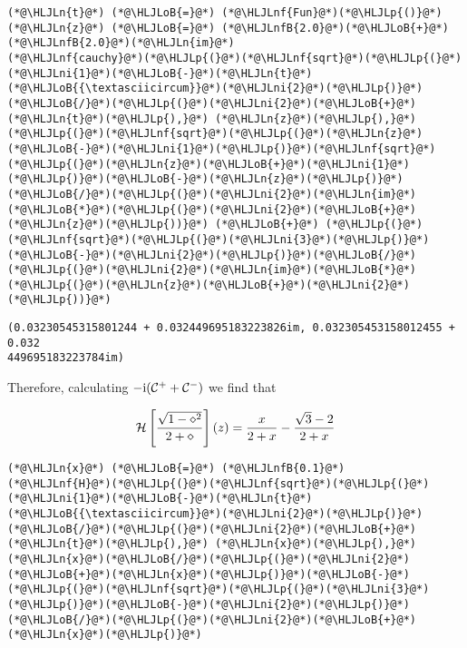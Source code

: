 \documentclass[12pt,landscape]{article}
\newcommand{\HLJLn}[1]{#1}
\newcommand{\HLJLnf}[1]{\textcolor[RGB]{66,102,213}{#1}}
\newcommand{\HLJLnfB}[1]{\textcolor[RGB]{59,151,46}{#1}}
\newcommand{\HLJLni}[1]{\textcolor[RGB]{59,151,46}{#1}}
\newcommand{\HLJLoB}[1]{\textcolor[RGB]{102,102,102}{\textbf{#1}}}
\newcommand{\HLJLp}[1]{#1}
\def\I{ {\rm i} }
\def\CC{ {\cal C} }
\def\HH{ {\cal H} }
\begin{document}
{\begin{lstlisting}
(*@\HLJLn{t}@*) (*@\HLJLoB{=}@*) (*@\HLJLnf{Fun}@*)(*@\HLJLp{()}@*)
(*@\HLJLn{z}@*) (*@\HLJLoB{=}@*) (*@\HLJLnfB{2.0}@*)(*@\HLJLoB{+}@*)(*@\HLJLnfB{2.0}@*)(*@\HLJLn{im}@*)
(*@\HLJLnf{cauchy}@*)(*@\HLJLp{(}@*)(*@\HLJLnf{sqrt}@*)(*@\HLJLp{(}@*)(*@\HLJLni{1}@*)(*@\HLJLoB{-}@*)(*@\HLJLn{t}@*)(*@\HLJLoB{{\textasciicircum}}@*)(*@\HLJLni{2}@*)(*@\HLJLp{)}@*)(*@\HLJLoB{/}@*)(*@\HLJLp{(}@*)(*@\HLJLni{2}@*)(*@\HLJLoB{+}@*)(*@\HLJLn{t}@*)(*@\HLJLp{),}@*) (*@\HLJLn{z}@*)(*@\HLJLp{),}@*) (*@\HLJLp{(}@*)(*@\HLJLnf{sqrt}@*)(*@\HLJLp{(}@*)(*@\HLJLn{z}@*)(*@\HLJLoB{-}@*)(*@\HLJLni{1}@*)(*@\HLJLp{)}@*)(*@\HLJLnf{sqrt}@*)(*@\HLJLp{(}@*)(*@\HLJLn{z}@*)(*@\HLJLoB{+}@*)(*@\HLJLni{1}@*)(*@\HLJLp{)}@*)(*@\HLJLoB{-}@*)(*@\HLJLn{z}@*)(*@\HLJLp{)}@*)(*@\HLJLoB{/}@*)(*@\HLJLp{(}@*)(*@\HLJLni{2}@*)(*@\HLJLn{im}@*)(*@\HLJLoB{*}@*)(*@\HLJLp{(}@*)(*@\HLJLni{2}@*)(*@\HLJLoB{+}@*)(*@\HLJLn{z}@*)(*@\HLJLp{))}@*) (*@\HLJLoB{+}@*) (*@\HLJLp{(}@*)(*@\HLJLnf{sqrt}@*)(*@\HLJLp{(}@*)(*@\HLJLni{3}@*)(*@\HLJLp{)}@*)(*@\HLJLoB{-}@*)(*@\HLJLni{2}@*)(*@\HLJLp{)}@*)(*@\HLJLoB{/}@*)(*@\HLJLp{(}@*)(*@\HLJLni{2}@*)(*@\HLJLn{im}@*)(*@\HLJLoB{*}@*)(*@\HLJLp{(}@*)(*@\HLJLn{z}@*)(*@\HLJLoB{+}@*)(*@\HLJLni{2}@*)(*@\HLJLp{))}@*)
\end{lstlisting}

\begin{lstlisting}
(0.03230545315801244 + 0.032449695183223826im, 0.032305453158012455 + 0.032
449695183223784im)
\end{lstlisting}


Therefore, calculating $-\I(\CC^+ + \CC^-)$ we find that

\[
\HH\left[{\sqrt{1-\diamond^2} \over 2+\diamond}\right](z) = {x\over 2+x} -{ \sqrt{3} -2 \over 2+x}
\]

\begin{lstlisting}
(*@\HLJLn{x}@*) (*@\HLJLoB{=}@*) (*@\HLJLnfB{0.1}@*)
(*@\HLJLnf{H}@*)(*@\HLJLp{(}@*)(*@\HLJLnf{sqrt}@*)(*@\HLJLp{(}@*)(*@\HLJLni{1}@*)(*@\HLJLoB{-}@*)(*@\HLJLn{t}@*)(*@\HLJLoB{{\textasciicircum}}@*)(*@\HLJLni{2}@*)(*@\HLJLp{)}@*)(*@\HLJLoB{/}@*)(*@\HLJLp{(}@*)(*@\HLJLni{2}@*)(*@\HLJLoB{+}@*)(*@\HLJLn{t}@*)(*@\HLJLp{),}@*) (*@\HLJLn{x}@*)(*@\HLJLp{),}@*) (*@\HLJLn{x}@*)(*@\HLJLoB{/}@*)(*@\HLJLp{(}@*)(*@\HLJLni{2}@*)(*@\HLJLoB{+}@*)(*@\HLJLn{x}@*)(*@\HLJLp{)}@*)(*@\HLJLoB{-}@*)(*@\HLJLp{(}@*)(*@\HLJLnf{sqrt}@*)(*@\HLJLp{(}@*)(*@\HLJLni{3}@*)(*@\HLJLp{)}@*)(*@\HLJLoB{-}@*)(*@\HLJLni{2}@*)(*@\HLJLp{)}@*)(*@\HLJLoB{/}@*)(*@\HLJLp{(}@*)(*@\HLJLni{2}@*)(*@\HLJLoB{+}@*)(*@\HLJLn{x}@*)(*@\HLJLp{)}@*)
\end{lstlisting}

}
\end{document}
